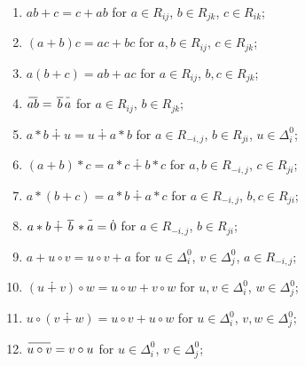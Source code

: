 \documentclass{article}
\theoremstyle{definition}
\newcommand{\inv}[1]{
    \!\;\overline{
        \!\!\:#1\vphantom !\!\!\:
    }\;\!
}
\begin{document}
\begin{enumerate}[label = {(R\arabic*)}]

    \item \label{mul-cen} \(
        ab + c = c + ab
    \) for \(a \in R_{ij}\), \(b \in R_{jk}\), \(c \in R_{ik}\);

    \item \label{mul-dis-l} \(
        (a + b)c = ac + bc
    \) for \(a, b \in R_{ij}\), \(c \in R_{jk}\);

    \item \label{mul-dis-r} \(
        a(b + c) = ab + ac
    \) for \(a \in R_{ij}\), \(b, c \in R_{jk}\);

    \item \label{inv-mul} \(
        \inv{ab} = \inv{\,b\,} \inv a
    \) for \(a \in R_{ij}\), \(b \in R_{jk}\);

    \item \label{str-cen} \(
        a * b \dotplus u = u \dotplus a * b
    \) for \(a \in R_{-i, j}\), \(b \in R_{ji}\), \(u \in \Delta^0_i\);

    \item \label{str-dis-l} \(
        (a + b) * c = a * c \dotplus b * c
    \) for \(a, b \in R_{-i, j}\), \(c \in R_{ji}\);

    \item \label{str-dis-r} \(
        a * (b + c) = a * b \dotplus a * c
    \) for \(a \in R_{-i, j}\), \(b, c \in R_{ji}\);

    \item \label{str-inv} \(
        a * b \dotplus \inv{\,b\,} * \inv a = \dot 0
    \) for \(a \in R_{-i, j}\), \(b \in R_{ji}\);

    \item \label{cir-cen} \(
        a + u \circ v = u \circ v + a
    \) for \(u \in \Delta^0_i\), \(v \in \Delta^0_j\), \(a \in R_{-i, j}\);

    \item \label{cir-dis-l} \(
        (u \dotplus v) \circ w = u \circ w + v \circ w
    \) for \(u, v \in \Delta^0_i\), \(w \in \Delta^0_j\);

    \item \label{cir-dis-r} \(
        u \circ (v \dotplus w) = u \circ v + u \circ w
    \) for \(u \in \Delta^0_i\), \(v, w \in \Delta^0_j\);

    \item \label{inv-cir} \(
        \inv{ u \circ v } = v \circ u
    \) for \(u \in \Delta^0_i\), \(v \in \Delta^0_j\);


\end{enumerate}
\end{document}
